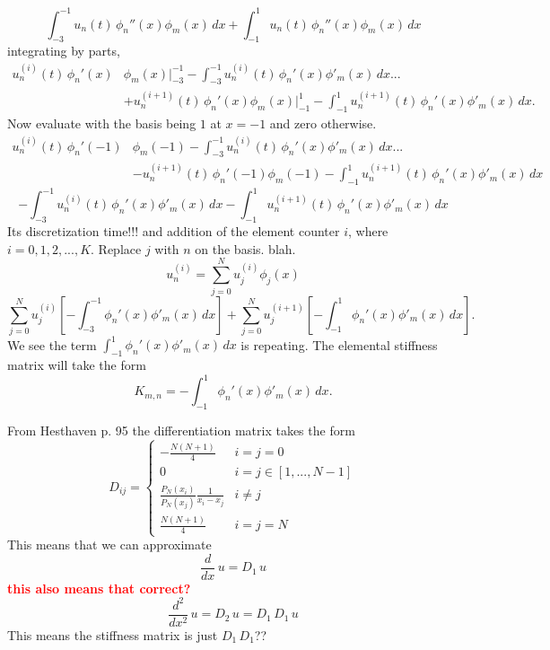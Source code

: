 \documentclass[12pt]{article}%
\begin{document}
\begin{equation}
\int_{-3}^{-1} u_n(t)\,\phi_n''(x) \phi_m(x)\,dx+\int_{-1}^1 u_n(t)\,\phi_n''(x) \phi_m(x)\,dx
\end{equation}
integrating by parts,
\begin{align}
u^{(i)}_n(t)\,\phi_n'(x)& \phi_m(x)\Big|_{-3}^{-1}-\int_{-3}^{-1} u^{(i)}_n(t)\,\phi_n'(x) \phi'_m(x)\,dx...\\
&+u_n^{(i+1)}(t)\,\phi_n'(x) \phi_m(x)\Big|_{-1}^{1}-\int_{-1}^{1} u^{(i+1)}_n(t)\,\phi_n'(x) \phi'_m(x)\,dx.\nonumber
\end{align}
Now evaluate with the basis being $1$ at $x=-1$ and zero otherwise.
\begin{align}
u_n^{(i)}(t)\,\phi_n'(-1)& \phi_m(-1)-\int_{-3}^{-1} u_n^{(i)}(t)\,\phi_n'(x) \phi'_m(x)\,dx...\\
&-u^{(i+1)}_n(t)\,\phi_n'(-1) \phi_m(-1)-\int_{-1}^{1} u_n^{(i+1)}(t)\,\phi_n'(x) \phi'_m(x)\,dx\nonumber
\end{align}
\begin{equation}
-\int_{-3}^{-1} u^{(i)}_n(t)\,\phi_n'(x) \phi'_m(x)\,dx-\int_{-1}^{1} u^{(i+1)}_n(t)\,\phi_n'(x) \phi'_m(x)\,dx
\end{equation}
Its discretization time!!! and addition of the element counter $i$, where $i=0,1,2,...,K$. Replace $j$ with $n$ on the basis. blah.
\begin{equation}
u^{(i)}_n=\sum_{j=0}^N u^{(i)}_j\phi_j(x)
\end{equation}
\begin{equation}
\sum_{j=0}^N u^{(i)}_j\left[-\int_{-3}^{-1} \phi_n'(x) \phi'_m(x)\,dx\right]+\sum_{j=0}^N u^{(i+1)}_j\left[-\int_{-1}^{1} \phi_n'(x) \phi'_m(x)\,dx\right].
\end{equation}
We see the term $\int_{-1}^{1} \phi_n'(x) \phi'_m(x)\,dx$ is repeating.
The elemental stiffness matrix will take the form
\begin{equation}
K_{m,n}=-\int_{-1}^{1} \phi_n'(x) \phi'_m(x)\,dx.
\end{equation}

From Hesthaven p. 95 the differentiation matrix takes the form
\begin{equation}
D_{ij}=\begin{cases}
-\frac{N(N+1)}{4} &i=j=0\\
0& i=j\in [1,...,N-1]\\
\frac{P_N(x_i)}{P_N(x_j)}\frac{1}{x_i-x_j} & i\neq j\\
\frac{N(N+1)}{4} & i=j=N
\end{cases}
\end{equation}
This means that we can approximate 
\begin{equation}
\frac{d}{dx}\,u = D_1 \,u
\end{equation}
\textcolor{red}{\textbf{this also means that correct?}}
\begin{equation}
\frac{d^2}{dx^2}\,u = D_2 \,u=D_1\,D_1 \,u
\end{equation}
This means the stiffness matrix is just $D_1\,D_1$??
\end{document}
